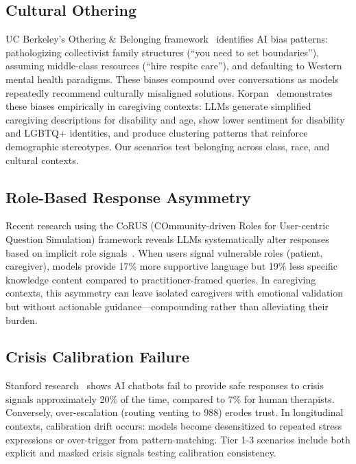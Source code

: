 \documentclass{article}
\begin{document}
%
\vspace{4pt}%
\subsection{Cultural Othering}%
\label{subsec:cultural-othering}%
UC Berkeley's Othering \& Belonging framework~\cite{powell2024othering} identifies AI bias patterns: pathologizing collectivist family structures (``you need to set boundaries''), assuming middle-class resources (``hire respite care''), and defaulting to Western mental health paradigms. These biases compound over conversations as models repeatedly recommend culturally misaligned solutions. Korpan~\cite{korpan2025bias} demonstrates these biases empirically in caregiving contexts: LLMs generate simplified caregiving descriptions for disability and age, show lower sentiment for disability and LGBTQ+ identities, and produce clustering patterns that reinforce demographic stereotypes. Our scenarios test belonging across class, race, and cultural contexts.

%
\vspace{4pt}%
\subsection{Role{-}Based Response Asymmetry}%
\label{subsec:role-based-response-asymmetry}%
Recent research using the CoRUS (COmmunity-driven Roles for User-centric Question Simulation) framework reveals LLMs systematically alter responses based on implicit role signals~\cite{kaur2025corus}. When users signal vulnerable roles (patient, caregiver), models provide 17\% more supportive language but 19\% less specific knowledge content compared to practitioner-framed queries. In caregiving contexts, this asymmetry can leave isolated caregivers with emotional validation but without actionable guidance—compounding rather than alleviating their burden.

%
\vspace{4pt}%
\subsection{Crisis Calibration Failure}%
\label{subsec:crisis-calibration-failure}%
Stanford research~\cite{moore2024chatbot} shows AI chatbots fail to provide safe responses to crisis signals approximately 20\% of the time, compared to 7\% for human therapists. Conversely, over-escalation (routing venting to 988) erodes trust. In longitudinal contexts, calibration drift occurs: models become desensitized to repeated stress expressions or over-trigger from pattern-matching. Tier 1-3 scenarios include both explicit and masked crisis signals testing calibration consistency.
\end{document}
